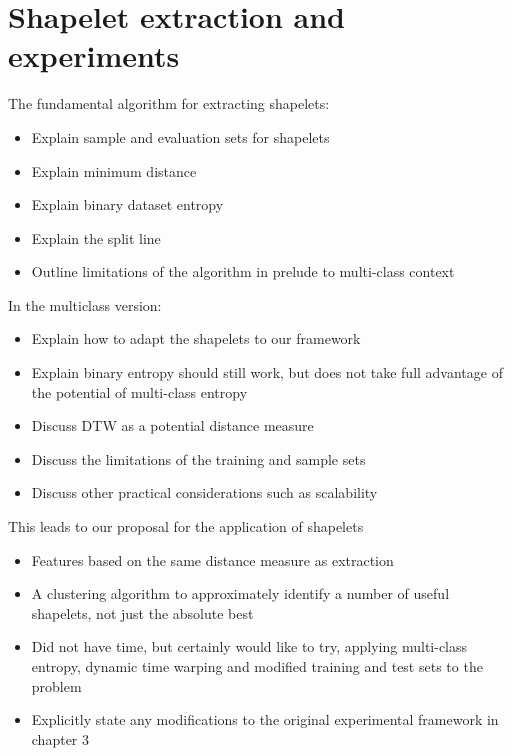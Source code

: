 \section{Shapelet extraction and experiments}
The fundamental algorithm for extracting shapelets:
\begin{itemize}
	\item Explain sample and evaluation sets for shapelets
	\item Explain minimum distance
	\item Explain binary dataset entropy
	\item Explain the split line
	\item Outline limitations of the algorithm in prelude to multi-class context
\end{itemize}
In the multiclass version:
\begin{itemize}
	\item Explain how to adapt the shapelets to our framework
	\item Explain binary entropy should still work, but does not take full advantage of the potential of multi-class entropy
	\item Discuss DTW as a potential distance measure
	\item Discuss the limitations of the training and sample sets
	\item Discuss other practical considerations such as scalability
\end{itemize}
This leads to our proposal for the application of shapelets
\begin{itemize}
	\item Features based on the same distance measure as extraction
	\item A clustering algorithm to approximately identify a number of useful shapelets, not just the absolute best
	\item Did not have time, but certainly would like to try, applying multi-class entropy, dynamic time warping and modified training and test sets to the problem
	\item Explicitly state any modifications to the original experimental framework in chapter 3
\end{itemize}
%
